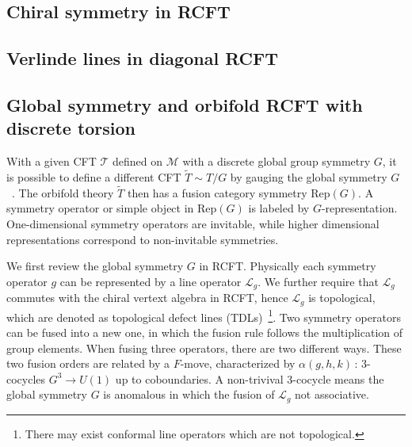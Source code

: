 \documentclass[submission, PhysLectNotes]{SciPost}
\begin{document}
\subsection{Chiral symmetry in RCFT}

\subsection{Verlinde lines in diagonal RCFT}

\subsection{Global symmetry and orbifold RCFT with discrete torsion}
With a given CFT $\mathcal{T}$ defined on $\mathcal{M}$ with a discrete global group symmetry $G$, it is possible to define a different CFT $\tilde{T} \sim T/G$ by gauging the global symmetry $G$~\cite{Douglas:aa,Gaberdiel_2000,Chang2019}. The orbifold theory $\tilde{T}$ then has a fusion category symmetry $\mathrm{Rep}(G)$. A symmetry operator or simple object in $\mathrm{Rep}(G)$ is labeled by $G$-representation. One-dimensional symmetry operators are invitable, while higher dimensional representations correspond to non-invitable symmetries. 

We first review the global symmetry $G$ in RCFT\@. Physically each symmetry operator $g$ can be represented by a line operator $\mathcal{L}_g$. We further require that $\mathcal{L}_g$ commutes with the chiral vertext algebra in RCFT, hence $\mathcal{L}_g$ is topological, which are denoted as topological defect lines (TDLs)~\footnote{There may exist conformal line operators which are not topological.}. Two symmetry operators can be fused into a new one, in which the fusion rule follows the multiplication of group elements. When fusing three operators, there are two different ways. These two fusion orders are related by a $F$-move, characterized by $\alpha(g,h,k)\,:\, 3$-cocycles $G^3 \rightarrow U(1)$ up to coboundaries. A non-trivival 3-cocycle means the global symmetry $G$ is anomalous in which the fusion of $\mathcal{L}_g$ not associative.
\end{document}
